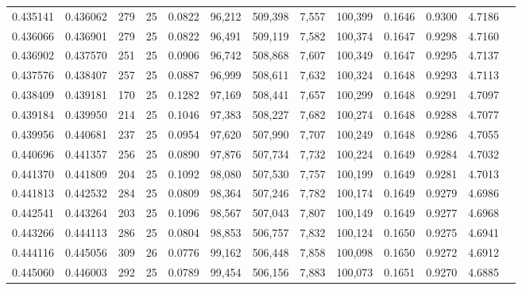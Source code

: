 \begin{tabular}{rrrrrrrrrrrrr}
0.435141 & 0.436062 &   279 &  25 &                                     0.0822 &  96,212 & 509,398 &   7,557 & 100,399 & 0.1646 & 0.9300 & 4.7186 \\
0.436066 & 0.436901 &   279 &  25 &                                     0.0822 &  96,491 & 509,119 &   7,582 & 100,374 & 0.1647 & 0.9298 & 4.7160 \\
0.436902 & 0.437570 &   251 &  25 &                                     0.0906 &  96,742 & 508,868 &   7,607 & 100,349 & 0.1647 & 0.9295 & 4.7137 \\
0.437576 & 0.438407 &   257 &  25 &                                     0.0887 &  96,999 & 508,611 &   7,632 & 100,324 & 0.1648 & 0.9293 & 4.7113 \\
0.438409 & 0.439181 &   170 &  25 &                                     0.1282 &  97,169 & 508,441 &   7,657 & 100,299 & 0.1648 & 0.9291 & 4.7097 \\
0.439184 & 0.439950 &   214 &  25 &                                     0.1046 &  97,383 & 508,227 &   7,682 & 100,274 & 0.1648 & 0.9288 & 4.7077 \\
0.439956 & 0.440681 &   237 &  25 &                                     0.0954 &  97,620 & 507,990 &   7,707 & 100,249 & 0.1648 & 0.9286 & 4.7055 \\
0.440696 & 0.441357 &   256 &  25 &                                     0.0890 &  97,876 & 507,734 &   7,732 & 100,224 & 0.1649 & 0.9284 & 4.7032 \\
0.441370 & 0.441809 &   204 &  25 &                                     0.1092 &  98,080 & 507,530 &   7,757 & 100,199 & 0.1649 & 0.9281 & 4.7013 \\
0.441813 & 0.442532 &   284 &  25 &                                     0.0809 &  98,364 & 507,246 &   7,782 & 100,174 & 0.1649 & 0.9279 & 4.6986 \\
0.442541 & 0.443264 &   203 &  25 &                                     0.1096 &  98,567 & 507,043 &   7,807 & 100,149 & 0.1649 & 0.9277 & 4.6968 \\
0.443266 & 0.444113 &   286 &  25 &                                     0.0804 &  98,853 & 506,757 &   7,832 & 100,124 & 0.1650 & 0.9275 & 4.6941 \\
0.444116 & 0.445056 &   309 &  26 &                                     0.0776 &  99,162 & 506,448 &   7,858 & 100,098 & 0.1650 & 0.9272 & 4.6912 \\
0.445060 & 0.446003 &   292 &  25 &                                     0.0789 &  99,454 & 506,156 &   7,883 & 100,073 & 0.1651 & 0.9270 & 4.6885 \\

\end{tabular}
